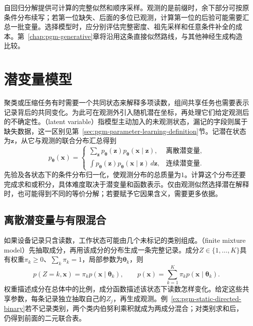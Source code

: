 自回归分解提供可计算的完整似然和顺序采样。观测的是前缀时，余下部分可按原条件分布续写；若第一位缺失、后面的多位已观测，计算第一位的后验可能需要汇总一批变量。选择模型时，应分别评估完整密度、祖先采样和任意条件补全的成本。第~\ref{chap:pgm-generative}章将沿用这条直接似然路线，与其他神经生成构造比较。

\section{潜变量模型}
\label{sec:pgm-static-directed-latent}

聚类或压缩任务有时需要一个共同状态来解释多项读数，组间共享任务也需要表示记录背后的共同变化。为此可在观测外引入随机潜在坐标，再处理它们给定观测后的不确定性。（latent variable）指模型主动加入的未观测状态，漏记的字段则属于缺失数据，这一区别见第~\ref{sec:pgm-parameter-learning-definition}节。记潜在状态为$\bm z$，从它与观测的联合分布汇总得到
\begin{equation}
  \label{eq:pgm-static-directed-marginal}
  p_{\bm{\theta}}(\bm{x})=
  \begin{cases}
    \sum_{\bm{z}}p_{\bm{\theta}}(\bm{z})
          p_{\bm{\theta}}(\bm{x}\mid\bm{z}),
          &\text{离散潜变量},\\
    \int p_{\bm{\theta}}(\bm{z})
          p_{\bm{\theta}}(\bm{x}\mid\bm{z})\,d\bm{z},
          &\text{连续潜变量}.
  \end{cases}
\end{equation}
先验及各状态下的条件分布归一化，使观测分布的总质量为$1$。计算这个分布还要完成求和或积分，具体难度取决于潜变量和函数表示。仅由观测似然选择潜在解释时，也可能得到不同的等价分解；若要赋予它因果含义，需要更多依据。

\subsection{离散潜变量与有限混合}
\label{sec:pgm-static-directed-mixtures}

如果设备记录只含读数，工作状态可能由几个未标记的类别组成。（finite mixture model）先抽取成分，再用该成分的分布生成一条完整记录。成分$Z\in\{1,\ldots,K\}$具有权重$\pi_k\ge0$、$\sum_k\pi_k=1$，局部参数为$\bm\theta_k$，则
\begin{equation}
  \label{eq:pgm-static-directed-mixture}
  p(Z=k,\bm{x})=\pi_k p(\bm{x}\mid\bm{\theta}_k),
  \qquad
  p(\bm{x})=\sum_{k=1}^{K}\pi_kp(\bm{x}\mid\bm{\theta}_k).
\end{equation}
权重描述成分在总体中的比例，成分函数描述该状态下读数怎样变化。给定这些共享参数，每条记录独立抽取自己的$Z_j$，再生成观测。例~\ref{ex:pgm-static-directed-binary}若不记录类别，两个类内伯努利乘积就成为两成分混合；对类别求和后，仍得到前面的二元联合表。

